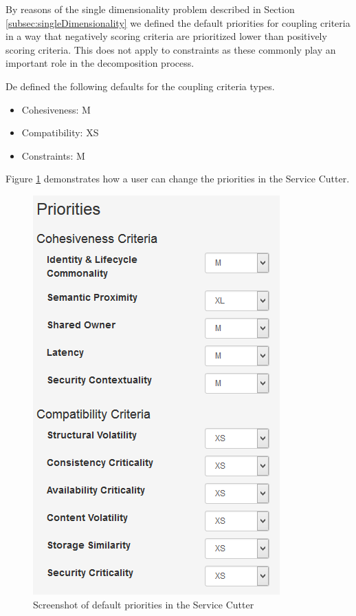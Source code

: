 \begin{minipage}[t]{0.3\textwidth}
\setlength{\parskip}{5pt plus 0.1pt}

By reasons of the single dimensionality problem described in Section \ref{subsec:singleDimensionality} we defined the default priorities for coupling criteria in a way that negatively scoring criteria are prioritized lower than positively scoring criteria. This does not apply to constraints as these commonly play an important role in the decomposition process. 

De defined the following defaults for the coupling criteria types.

\begin{itemize}
\item Cohesiveness: M
\item Compatibility: XS
\item Constraints: M
\end{itemize}

Figure \ref{fig:priorities} demonstrates how a user can change the priorities in the Service Cutter.

\end{minipage}
\begin{minipage}[t]{0.75\textwidth}
	\begin{figure}[H]
		\begin{center}
			\includegraphics[scale=0.6]{images/priorities.png}
			\caption{Screenshot of default priorities in the Service Cutter}
			\label{fig:priorities}
		\end{center}
	\end{figure}
\end{minipage}

